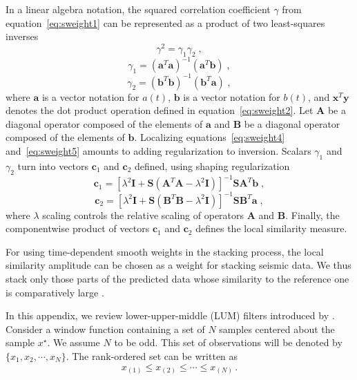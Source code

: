 In a linear algebra notation, the squared correlation coefficient $\gamma$
from equation~\ref{eq:sweight1} can be represented as a product of two
least-squares inverses
\begin{equation}
  \label{eq:sweight3}
     \gamma^2 = \gamma_1 \gamma_2\;,
\end{equation} 
\begin{equation}
  \label{eq:sweight4}
     \gamma_1 = (\mathbf{a}^T \mathbf{a})^{-1}(\mathbf{a}^T \mathbf{b})\;,
\end{equation} 
\begin{equation}
  \label{eq:sweight5}
     \gamma_2 = (\mathbf{b}^T \mathbf{b})^{-1}(\mathbf{b}^T \mathbf{a})\;,
\end{equation} 
where $\mathbf{a}$ is a vector notation for $a(t)$, $\mathbf{b}$ is a
vector notation for $b(t)$, and $\mathbf{x}^T \mathbf{y}$ denotes the
dot product operation defined in equation~\ref{eq:sweight2}. Let
$\mathbf{A}$ be a diagonal operator composed of the elements of
$\mathbf{a}$ and $\mathbf{B}$ be a diagonal operator composed of the
elements of $\mathbf{b}$. Localizing equations~\ref{eq:sweight4}
and~\ref{eq:sweight5} amounts to adding regularization to
inversion. Scalars $\gamma_1$ and $\gamma_2$ turn into vectors
$\mathbf{c}_1$ and $\mathbf{c}_2$ defined, using shaping
regularization \cite[]{Fomel07b}
\begin{equation}
  \label{eq:sweight6}
     \mathbf{c}_1 = [\lambda^2 \mathbf{I} + \mathbf{S}(\mathbf{A}^T \mathbf{A} - \lambda^2 \mathbf{I})]^{-1}\mathbf{S}\mathbf{A}^T\mathbf{b}\;,
\end{equation} 
\begin{equation}
  \label{eq:sweight7}
     \mathbf{c}_2 = [\lambda^2 \mathbf{I} + \mathbf{S}(\mathbf{B}^T \mathbf{B} - \lambda^2 \mathbf{I})]^{-1}\mathbf{S}\mathbf{B}^T\mathbf{a}\;,
\end{equation} 
where $\lambda$ scaling controls the relative scaling of operators
$\mathbf{A}$ and $\mathbf{B}$. Finally, the componentwise product of
vectors $\mathbf{c}_1$ and $\mathbf{c}_2$ defines the local similarity
measure.

For using time-dependent smooth weights in the stacking process, the
local similarity amplitude can be chosen as a weight for stacking
seismic data. We thus stack only those parts of the predicted data whose
similarity to the reference one is comparatively large \cite[]{Liu09b}.


In this appendix, we review lower-upper-middle (LUM)
filters introduced by \cite{Hardie93}. Consider a window function
containing a set of $N$ samples centered about the sample $x^{\star}$. We
assume $N$ to be odd. This set of observations will be denoted by
$\{x_1,x_2,\cdots,x_N\}$. The rank-ordered set can be written as
\begin{equation}
   x_{(1)} \le x_{(2)} \le \cdots \le x_{(N)}\,.
  \label{eq:lum1}
\end{equation}

